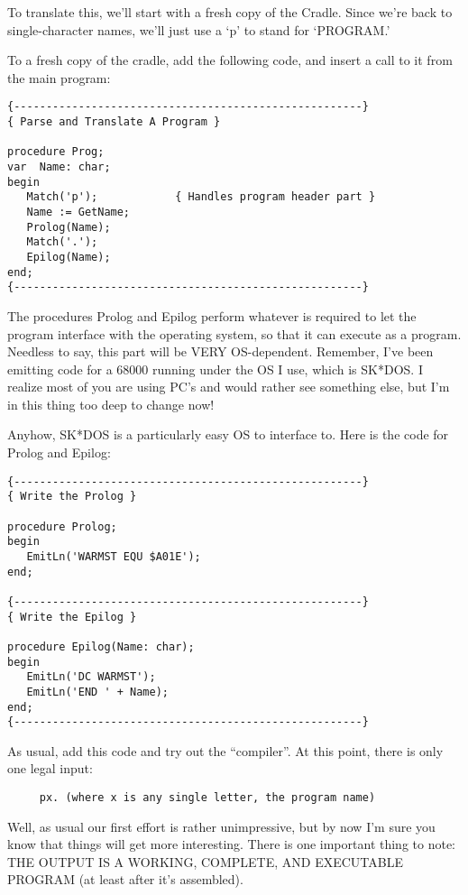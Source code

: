 To translate this, we'll  start  with a fresh copy of the Cradle. Since we're back to single-character  names, we'll just use a `p' to stand for `PROGRAM.'

To a fresh copy of the cradle, add the following code, and insert a call to it from the main program:

\begin{verbatim}
{------------------------------------------------------}
{ Parse and Translate A Program }

procedure Prog;
var  Name: char;
begin
   Match('p');            { Handles program header part }
   Name := GetName;
   Prolog(Name);
   Match('.');
   Epilog(Name);
end;
{------------------------------------------------------}
\end{verbatim}

The procedures  Prolog and Epilog perform whatever is required to let the program interface with the operating system, so  that it can execute as a program. Needless to  say, this  part  will be VERY OS-dependent. Remember, I've been emitting code for a 68000 running under the OS I use, which is SK*DOS. I  realize most of you are using PC's  and  would rather see something else, but I'm in this thing too deep to change now!

Anyhow, SK*DOS is a  particularly  easy OS to interface to. Here is the code for Prolog and Epilog:

\begin{verbatim}
{------------------------------------------------------}
{ Write the Prolog }

procedure Prolog;
begin
   EmitLn('WARMST EQU $A01E');
end;

{------------------------------------------------------}
{ Write the Epilog }

procedure Epilog(Name: char);
begin
   EmitLn('DC WARMST');
   EmitLn('END ' + Name);
end;
{------------------------------------------------------}
\end{verbatim}

As usual, add  this  code  and  try  out the ``compiler''.  At this point, there is only one legal input:

\begin{verbatim}
     px. (where x is any single letter, the program name)
\end{verbatim}

Well, as  usual  our first effort is rather unimpressive, but by now  I'm sure you know that things  will  get  more  interesting. There is one important thing to  note:   THE OUTPUT IS A WORKING, COMPLETE, AND EXECUTABLE PROGRAM (at least after it's assembled).

